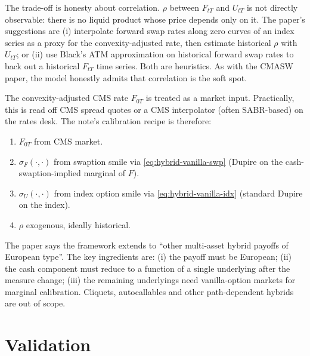 \documentclass[11pt,a4paper]{article}
\begin{document}
\begin{commentary}
The trade-off is honesty about correlation. $\rho$ between
$F_{tT}$ and $U_{tT}$ is not directly observable: there is no
liquid product whose price depends only on it. The paper's
suggestions are (i) interpolate forward swap rates along zero curves
of an index series as a proxy for the convexity-adjusted rate, then
estimate historical $\rho$ with $U_{tT}$; or (ii) use Black's ATM
approximation on historical forward swap rates to back out a
historical $F_{tT}$ time series. Both are heuristics. As with the
CMASW paper, the model honestly admits that correlation is the soft
spot.
\end{commentary}

\begin{commentary}
The convexity-adjusted CMS rate $F_{0T}$ is treated as a market
input. Practically, this is read off CMS spread quotes or a CMS
interpolator (often SABR-based) on the rates desk. The note's
calibration recipe is therefore:
\begin{enumerate}[noitemsep]
  \item $F_{0T}$ from CMS market.
  \item $\sigma_F(\cdot, \cdot)$ from swaption smile via
        \eqref{eq:hybrid-vanilla-swp} (Dupire on the
        cash-swaption-implied marginal of $F$).
  \item $\sigma_U(\cdot, \cdot)$ from index option smile via
        \eqref{eq:hybrid-vanilla-idx} (standard Dupire on the index).
  \item $\rho$ exogenous, ideally historical.
\end{enumerate}
\end{commentary}

\begin{commentary}
The paper says the framework extends to ``other multi-asset hybrid
payoffs of European type''. The key ingredients are: (i) the payoff
must be European; (ii) the cash component must reduce to a function
of a single underlying after the measure change; (iii) the remaining
underlyings need vanilla-option markets for marginal calibration.
Cliquets, autocallables and other path-dependent hybrids are out of
scope.
\end{commentary}

\section{Validation}
\end{document}
